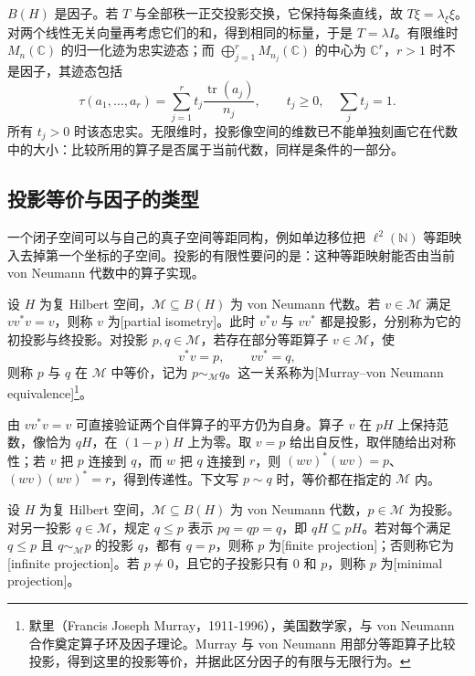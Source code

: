 \ProseParagraphBreak
\(B(H)\) 是因子。若 \(T\) 与全部秩一正交投影交换，它保持每条直线，故 \(T\xi=\lambda_\xi\xi\)。对两个线性无关向量再考虑它们的和，得到相同的标量，于是 \(T=\lambda I\)。有限维时 \(M_n(\mathbb C)\) 的归一化迹为忠实迹态；而 \(\bigoplus_{j=1}^rM_{n_j}(\mathbb C)\) 的中心为 \(\mathbb C^r\)，\(r>1\) 时不是因子，其迹态包括
\[
	\tau(a_1,\ldots,a_r)=\sum_{j=1}^r t_j\frac{\operatorname{tr}(a_j)}{n_j}, \qquad t_j\ge0,\quad\sum_jt_j=1.
\]
所有 \(t_j>0\) 时该态忠实。无限维时，投影像空间的维数已不能单独刻画它在代数中的大小：比较所用的算子是否属于当前代数，同样是条件的一部分。

\subsection{投影等价与因子的类型}
\label{b2:subsec:D04:04}

一个闭子空间可以与自己的真子空间等距同构，例如单边移位把 \(\ell^2(\mathbb N)\) 等距映入去掉第一个坐标的子空间。投影的有限性要问的是：这种等距映射能否由当前 von Neumann 代数中的算子实现。

\begin{definition}\label{b2:def:projection-equivalence}
	设 \(H\) 为复 Hilbert 空间，\(\mathcal M\subseteq B(H)\) 为 von Neumann 代数。若 \(v\in\mathcal M\) 满足 \(vv^*v=v\)，则称 \(v\) 为[partial isometry]。此时 \(v^*v\) 与 \(vv^*\) 都是投影，分别称为它的初投影与终投影。对投影 \(p,q\in\mathcal M\)，若存在部分等距算子 \(v\in\mathcal M\)，使
	\[
		v^*v=p,\qquad vv^*=q,
	\]
	则称 \(p\) 与 \(q\) 在 \(\mathcal M\) 中等价，记为 \(p\sim_{\mathcal M}q\)。这一关系称为[Murray--von Neumann equivalence]\footnote{默里（Francis Joseph Murray，1911-1996），美国数学家，与 von Neumann 合作奠定算子环及因子理论。Murray 与 von Neumann 用部分等距算子比较投影，得到这里的投影等价，并据此区分因子的有限与无限行为。}。
\end{definition}

由 \(vv^*v=v\) 可直接验证两个自伴算子的平方仍为自身。算子 \(v\) 在 \(pH\) 上保持范数，像恰为 \(qH\)，在 \((1-p)H\) 上为零。取 \(v=p\) 给出自反性，取伴随给出对称性；若 \(v\) 把 \(p\) 连接到 \(q\)，而 \(w\) 把 \(q\) 连接到 \(r\)，则 \((wv)^*(wv)=p\)、\((wv)(wv)^*=r\)，得到传递性。下文写 \(p\sim q\) 时，等价都在指定的 \(\mathcal M\) 内。

\begin{definition}\label{b2:def:finite-minimal-projection}
	设 \(H\) 为复 Hilbert 空间，\(\mathcal M\subseteq B(H)\) 为 von Neumann 代数，\(p\in\mathcal M\) 为投影。对另一投影 \(q\in\mathcal M\)，规定 \(q\le p\) 表示 \(pq=qp=q\)，即 \(qH\subseteq pH\)。若对每个满足 \(q\le p\) 且 \(q\sim_{\mathcal M}p\) 的投影 \(q\)，都有 \(q=p\)，则称 \(p\) 为[finite projection]；否则称它为[infinite projection]。若 \(p\ne0\)，且它的子投影只有 \(0\) 和 \(p\)，则称 \(p\) 为[minimal projection]。
\end{definition}

